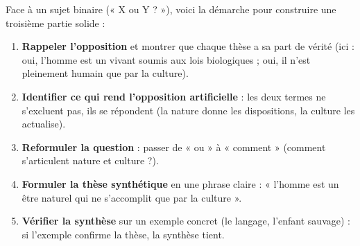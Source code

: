 \documentclass[11pt]{article}
\begin{document}
\begin{methode}
Face à un sujet binaire (« X ou Y ? »), voici la démarche pour construire une troisième partie solide :
\begin{enumerate}
\item \textbf{Rappeler l'opposition} et montrer que chaque thèse a sa part de vérité (ici : oui, l'homme est un vivant soumis aux lois biologiques ; oui, il n'est pleinement humain que par la culture).
\item \textbf{Identifier ce qui rend l'opposition artificielle} : les deux termes ne s'excluent pas, ils se répondent (la nature donne les dispositions, la culture les actualise).
\item \textbf{Reformuler la question} : passer de « ou » à « comment » (comment s'articulent nature et culture ?).
\item \textbf{Formuler la thèse synthétique} en une phrase claire : « l'homme est un être naturel qui ne s'accomplit que par la culture ».
\item \textbf{Vérifier la synthèse} sur un exemple concret (le langage, l'enfant sauvage) : si l'exemple confirme la thèse, la synthèse tient.
\end{enumerate}
\end{methode}
\end{document}
